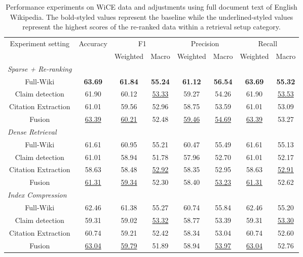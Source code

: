 \begin{table}[htb!]
\centering
\footnotesize
\begin{tabular}{c c c c c c c c}
\multirow{2}{*}{Experiment setting} & \multirow{2}{*}{Accuracy} & \multicolumn{2}{c}{F1} & \multicolumn{2}{c}{Precision} & \multicolumn{2}{c}{Recall}  \\ 
\cline{3-8}
  & &  Weighted  & Macro & Weighted & Macro & Weighted & Macro      \\
\hline
\multicolumn{1}{l}{\textit{Sparse + Re-ranking}} & & & & \\
Full-Wiki & \textbf{63.69} &  \textbf{61.84} &  \textbf{55.24} &  \textbf{61.12} &  \textbf{56.54} &  \textbf{63.69} &  \textbf{55.32 } \\
Claim detection & 61.90 & 60.12 & \underline{53.33} & 59.27 & 54.26 & 61.90 & \underline{53.53} \\
Citation Extraction & 61.01 & 59.56 & 52.96 & 58.75 & 53.59 & 61.01 & 53.09 \\
Fusion & \underline{63.39} & \underline{60.21} & 52.48 & \underline{59.46} & \underline{54.69} & \underline{63.39} & 53.27  \\[5mm]

\hline
\multicolumn{1}{l}{\textit{Dense Retrieval}} & & & & \\
Full-Wiki &  61.61 & 60.95 & 55.21 & 60.47 & 55.49 & 61.61 & 55.13 \\
Claim detection & 61.01 & 58.94 & 51.78 & 57.96 & 52.70 & 61.01 & 52.17 \\
Citation Extraction & 58.63 & 58.48 & \underline{52.92} & 58.35 & 52.95 & 58.63 & \underline{52.91} \\
Fusion & \underline{61.31} & \underline{59.34} & 52.30 & 58.40 & \underline{53.23} & \underline{61.31} & 52.62  \\[5mm]

\hline
\multicolumn{1}{l}{\textit{Index Compression}} & & & & & & &  \\
Full-Wiki & 62.46 & 61.38 & 55.27 & 60.74 & 55.84 & 62.46 & 55.20  \\
Claim detection & 59.31 & 59.02 & \underline{53.32} & 58.77 & 53.39 & 59.31 & \underline{53.30}  \\
Citation Extraction & 60.74 & 59.21 & 52.42 & 58.34 & 53.04 & 60.74 & 52.60  \\
Fusion & \underline{63.04} & \underline{59.79} & 51.89 & 58.94 & \underline{53.97} & \underline{63.04} & 52.76 \\[5mm]

\hline
\end{tabular}
\caption{Performance experiments on WiCE data and adjustments using full document text of English Wikipedia. The bold-styled values represent the baseline while the underlined-styled values represent the highest scores of the re-ranked data within a retrieval setup category.}
\label{tab:wice_performance_metrics}
\end{table}
% 
